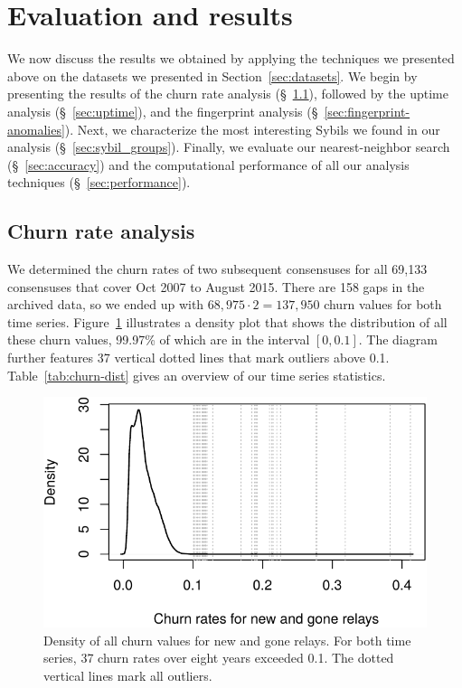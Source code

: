 \section{Evaluation and results}
\label{sec:results}
We now discuss the results we obtained by applying the techniques we presented
above on the datasets we presented in Section~\ref{sec:datasets}.  We begin by
presenting the results of the churn rate analysis (\S~\ref{sec:churn}), followed
by the uptime analysis (\S~\ref{sec:uptime}), and the fingerprint analysis
(\S~\ref{sec:fingerprint-anomalies}).  Next, we characterize the most
interesting Sybils we found in our analysis (\S~\ref{sec:sybil_groups}).
Finally, we evaluate our nearest-neighbor search (\S~\ref{sec:accuracy}) and the
computational performance of all our analysis techniques
(\S~\ref{sec:performance}).

\subsection{Churn rate analysis}
\label{sec:churn}
We determined the churn rates of two subsequent consensuses for all 69,133
consensuses that cover Oct 2007 to August 2015.  There are 158 gaps in the
archived data, so we ended up with $68,975 \cdot 2 = 137,950$ churn values for
both time series.  Figure~\ref{fig:churn-density} illustrates a density plot
that shows the distribution of all these churn values, 99.97\% of which are in
the interval $[0, 0.1]$.  The diagram further features 37 vertical dotted lines
that mark outliers above 0.1.  Table~\ref{tab:churn-dist} gives an overview of
our time series statistics.

\begin{figure}[t]
	\centering
	\includegraphics[width=\linewidth]{diagrams/churn-density.pdf}
	\caption{Density of all churn values for new and gone relays.  For both
	time series, 37 churn rates over eight years exceeded 0.1.  The dotted
	vertical lines mark all outliers.}
	\label{fig:churn-density}
\end{figure}

